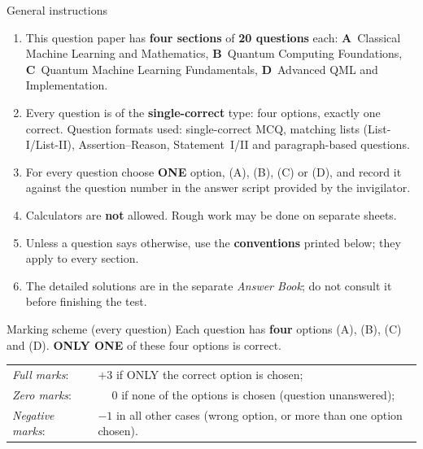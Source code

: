 \documentclass[11pt,a4paper]{article}
\begin{document}
\vspace{6pt}
\begin{infobox}{General instructions}
\begin{enumerate}[leftmargin=1.4em, itemsep=1pt, topsep=1pt]
\item This question paper has \textbf{four sections} of \textbf{20 questions} each:
\textbf{A}~Classical Machine Learning and Mathematics, \textbf{B}~Quantum Computing Foundations, \textbf{C}~Quantum Machine Learning Fundamentals, \textbf{D}~Advanced QML and Implementation.
\item Every question is of the \textbf{single-correct} type: four options, exactly one correct. Question formats used:
single-correct MCQ, matching lists (List-I/List-II), Assertion--Reason, Statement~I/II and paragraph-based questions.
\item For every question choose \textbf{ONE} option, (A), (B), (C) or (D), and record it against the question number in the answer script provided by the invigilator.
\item Calculators are \textbf{not} allowed. Rough work may be done on separate sheets.
\item Unless a question says otherwise, use the \textbf{conventions} printed below; they apply to every section.
\item The detailed solutions are in the separate \emph{Answer Book}; do not consult it before finishing the test.
\end{enumerate}
\end{infobox}
\begin{infobox}{Marking scheme (every question)}
Each question has \textbf{four} options (A), (B), (C) and (D). \textbf{ONLY ONE} of these four options is correct.\\[2pt]
\begin{tabular}{@{}ll@{}}
\emph{Full marks}: & $+3$ if ONLY the correct option is chosen;\\
\emph{Zero marks}: & $\phantom{+}0$ if none of the options is chosen (question unanswered);\\
\emph{Negative marks}: & $-1$ in all other cases (wrong option, or more than one option chosen).
\end{tabular}
\end{infobox}
\end{document}
